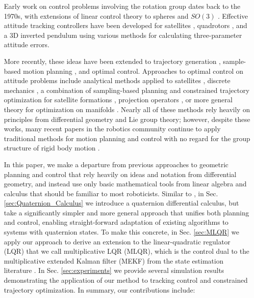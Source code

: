 \documentclass[letterpaper, 10 pt, conference]{ieeeconf}  %
\begin{document}
    Early work on control problems involving the rotation group dates back to the 1970s,
    with extensions of linear control theory to spheres \cite{Brockett1973} and $SO(3)$
    \cite{Baillieul1978}. Effective attitude tracking controllers have been developed for
    satellites \cite{wie1985quaternion}, quadrotors
    \cite{Fresk2013,Liu2015,lee2010geometric,
    Johnson2005,watterson2020control,mellinger2011minimum}, and a 3D inverted pendulum
    \cite{Chaturvedi2009} using various methods for calculating three-parameter attitude
    errors.

    More recently, these ideas have been extended to trajectory generation
    \cite{Zefran1998}, sample-based motion planning \cite{Zefran1999,Kuffner2004}, and
    optimal control. Approaches to optimal control on attitude problems include
    analytical methods applied to satellites \cite{Spindler1998}, discrete mechanics
    \cite{Kobilarov2011,Kobilarov2014, Lee2008}, a combination of sampling-based planning
    and constrained trajectory optimization for satellite formations \cite{Garcia2005,
    Aoude2008}, projection operators \cite{Saccon2013}, or more general theory for
    optimization on manifolds \cites{watterson2018trajectory}. Nearly all of these
    methods rely heavily on principles from differential geometry and Lie group theory;
    however, despite these works, many recent papers in the robotics community continue
    to apply traditional methods for motion planning and control with no regard for the
    group structure of rigid body motion \cite{Alothman2016,deCrousaz2015,
    Williams2017,Geisert2016}.
    
    In this paper, we make a departure from previous approaches to geometric planning and 
    control that rely heavily on ideas and notation from differential geometry, 
    and instead use only basic mathematical tools from linear algebra and calculus that 
    should be familiar to most roboticists. 
    Similar to \cite{Mandic2011,Xu2016}, in Sec. \ref{sec:Quaternion_Calculus} we introduce 
    a quaternion differential calculus, but take a significantly simpler and more general 
    approach that unifies both planning and control, enabling straight-forward adaptation of 
    existing algorithms to systems with quaternion states. 
    To make this concrete, in Sec. \ref{sec:MLQR} we apply our approach to derive an 
    extension to the linear-quadratic regulator (LQR) that we call multiplicative LQR (MLQR), 
    which is the control dual to the multiplicative extended Kalman filter (MEKF) from the 
    state estimation literature \cite{markley2014fundamentals}. 
    In Sec. \ref{sec:experiments} we provide several simulation results demonstrating the 
    application of our method to tracking control and constrained trajectory optimization.
    In summary, our contributions include:
\end{document}
